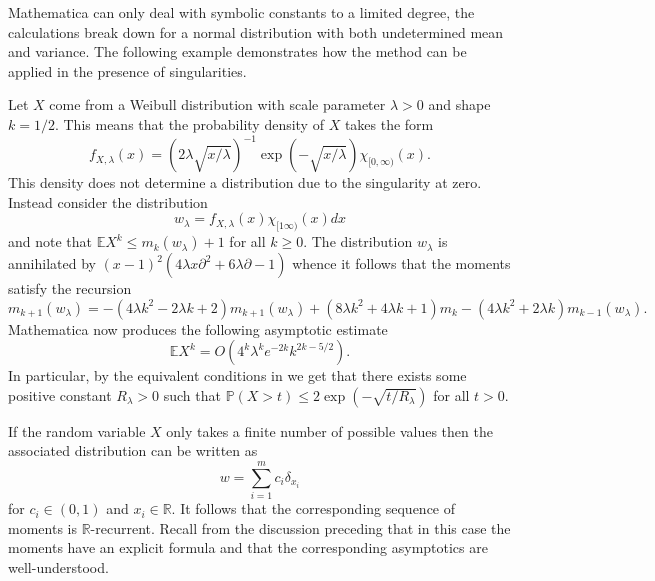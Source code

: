 Mathematica can only deal with symbolic constants to a limited degree, the calculations break down for a normal distribution with both undetermined mean and variance.
The following example demonstrates how the method can be applied in the presence of singularities.
\begin{example}
  Let $X$ come from a Weibull distribution with scale parameter $\lambda>0$ and shape $k = 1/2$.
  This means that the probability density of $X$ takes the form
  $$f_{X,\lambda}(x) = (2 \lambda \sqrt{x/\lambda})^{-1}\exp(-\sqrt{x/\lambda})\chi_{[0,\infty)}(x).$$
  This density does not determine a distribution due to the singularity at zero.
  Instead consider the distribution
  $$w_\lambda = f_{X,\lambda}(x)\chi_{[1\infty)}(x)dx $$
  and note that $\mathbb{E}X^k \leq m_k(w_\lambda) + 1$ for all $k\geq 0$.
  The distribution $w_\lambda$ is annihilated by $(x-1)^2(4 \lambda x \partial^2 + 6\lambda\partial - 1)$
  whence it follows that the moments satisfy the recursion
  $$m_{k+1}(w_\lambda) = -(4\lambda k^2 - 2\lambda k + 2)m_{k+1}(w_\lambda) + (8\lambda k^2 + 4\lambda k + 1)m_k - (4\lambda k^2 + 2\lambda k)m_{k-1}(w_\lambda).$$
  Mathematica now produces the following asymptotic estimate
  $$\mathbb{E}X^k = O\left(4^k\lambda^k e^{-2k}k^{2k -5/2}\right).$$
  In particular, by the equivalent conditions in  we get that there exists some positive constant $R_\lambda>0$ such that  $\mathbb{P}(X>t) \leq 2\exp(- \sqrt{t/R_\lambda}) $ for all $t>0$.
\end{example}
\begin{remark}
  If the random variable $X$ only takes a finite number of possible values then the associated distribution can be written as
  $$w = \sum_{i=1}^m c_i \delta_{x_i}$$
  for $c_i\in (0,1)$ and $x_i\in \mathbb{R}$.
  It follows that the corresponding sequence of moments is $\mathbb{R}$-recurrent.
  Recall from the discussion preceding  that in this case the moments have an explicit formula and that the corresponding asymptotics are well-understood.
\end{remark}

